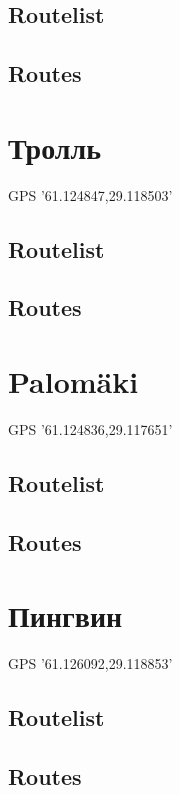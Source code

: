 \documentclass[8pt, a5paper,notitlepage,openany]{report}
\begin{document}
\subsection{Routelist}

\newpage
\subsection{Routes}


\clearpage
 \section{Тролль}
 GPS '61.124847,29.118503'
\subsection{Routelist}

\newpage
\subsection{Routes}


\clearpage
 \section{Palomäki}
 GPS '61.124836,29.117651'
\subsection{Routelist}

\newpage
\subsection{Routes}



\clearpage
 \section{Пингвин}
 GPS '61.126092,29.118853'
\subsection{Routelist}

\newpage
\subsection{Routes}

\end{document}
